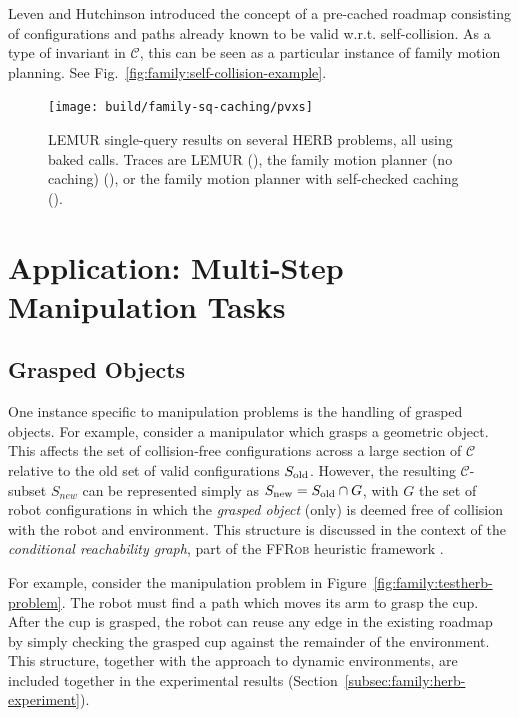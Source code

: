 Leven and Hutchinson \citep{leven2000changing}
introduced the concept of a pre-cached roadmap consisting of
configurations and paths already known to be valid w.r.t.
self-collision.
As a type of invariant in $\mathcal{C}$,
this can be seen as a particular instance of family motion planning.
See Fig.~\ref{fig:family:self-collision-example}.

\begin{figure}
   \centering   
   \texttt{[image: build/family-sq-caching/pvxs]}
   \caption[]{LEMUR single-query results on several HERB problems,
      all using baked calls.
      Traces are LEMUR
      (\protect{}),
      the family motion planner (no caching)
      (\protect{}),
      or the family motion planner with self-checked caching
      (\protect{}).}
\end{figure}

\section{Application: Multi-Step Manipulation Tasks}
\label{subsec:family:app-multi-step}

\subsection{Grasped Objects}
\label{subsec:family:grasped-objects}

One instance specific to manipulation problems is the handling of
grasped objects.
For example, 
consider a manipulator which grasps a geometric object.
This affects the set of collision-free configurations
across a large section of $\mathcal{C}$
relative to the old set of valid configurations $S_{\mbox{\scriptsize old}}$.
However,
the resulting $\mathcal{C}$-subset $S_{new}$
can be represented simply as
$S_{\mbox{\scriptsize new}} = S_{\mbox{\scriptsize old}} \cap G$,
with $G$ the set of robot configurations in which
the \emph{grasped object} (only)
is deemed free of collision with the robot and environment.
This structure is discussed in the context of the
\emph{conditional reachability graph},
part of the \textsc{FFRob} heuristic framework
\citep{garrett2014ffrob}.

For example,
consider the manipulation problem in
Figure~\ref{fig:family:testherb-problem}.
The robot must find a path which moves its arm to grasp the cup.
After the cup is grasped,
the robot can reuse any edge in the existing roadmap
by simply checking the grasped cup
against the remainder of the environment.
This structure,
together with the approach to dynamic environments,
are included together in the experimental results
(Section~\ref{subsec:family:herb-experiment}).

